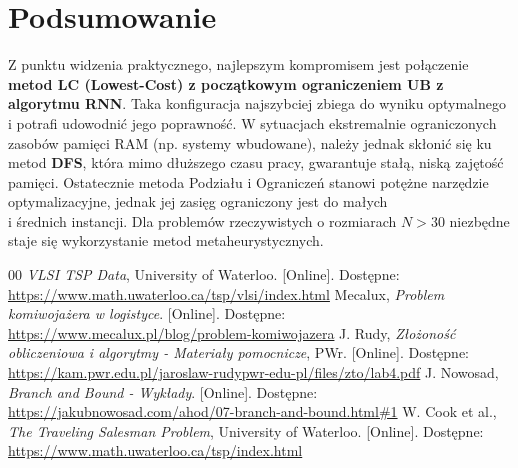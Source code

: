\documentclass[conference]{IEEEtran}
\begin{document}
        \section{Podsumowanie}
            Z punktu widzenia praktycznego, najlepszym kompromisem jest połączenie \textbf{metod LC (Lowest-Cost) z początkowym ograniczeniem UB z algorytmu RNN}. Taka konfiguracja najszybciej zbiega do wyniku optymalnego i potrafi udowodnić jego poprawność. W sytuacjach ekstremalnie ograniczonych zasobów pamięci RAM (np. systemy wbudowane), należy jednak skłonić się ku metod \textbf{DFS}, która mimo dłuższego czasu pracy, gwarantuje stałą, niską zajętość pamięci. Ostatecznie metoda Podziału i Ograniczeń stanowi potężne narzędzie optymalizacyjne, jednak jej zasięg ograniczony jest do małych\\i średnich instancji. Dla problemów rzeczywistych o rozmiarach $N > 30$ niezbędne staje się wykorzystanie metod metaheurystycznych.


    \begin{thebibliography}{00}
         \textit{VLSI TSP Data}, University of Waterloo. [Online]. Dostępne: \url{https://www.math.uwaterloo.ca/tsp/vlsi/index.html}
         Mecalux, \textit{Problem komiwojażera w logistyce}. [Online]. Dostępne: \url{https://www.mecalux.pl/blog/problem-komiwojazera}
         J. Rudy, \textit{Złożoność obliczeniowa i algorytmy - Materiały pomocnicze}, PWr. [Online]. Dostępne: \url{https://kam.pwr.edu.pl/jaroslaw-rudypwr-edu-pl/files/zto/lab4.pdf}
         J. Nowosad, \textit{Branch and Bound - Wykłady}. [Online]. Dostępne: \url{https://jakubnowosad.com/ahod/07-branch-and-bound.html#1}
         W. Cook et al., \textit{The Traveling Salesman Problem}, University of Waterloo. [Online]. Dostępne: \url{https://www.math.uwaterloo.ca/tsp/index.html}
    \end{thebibliography}
\end{document}
